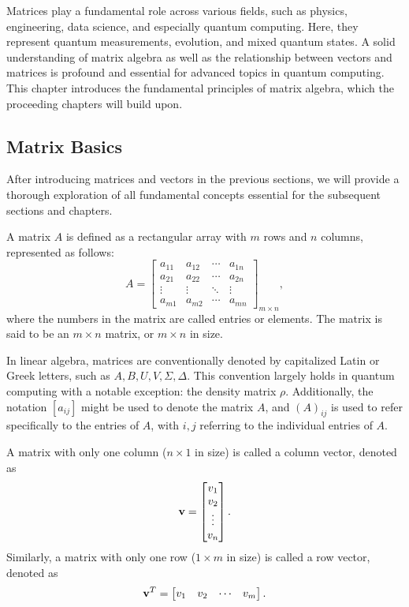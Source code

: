 \documentclass[12pt]{article}
\begin{document}
Matrices play a fundamental role across various fields, such as physics, engineering, data science, and especially quantum computing. Here, they represent quantum measurements, evolution, and mixed quantum states. A solid understanding of matrix algebra as well as the relationship between vectors and matrices is profound and essential for advanced topics in quantum computing. This chapter introduces the fundamental principles of matrix algebra, which the proceeding chapters will build upon. 

\subsection{Matrix Basics}

After introducing matrices and vectors in the previous sections, we will provide a thorough exploration of all fundamental concepts essential for the subsequent sections and chapters.

\begin{definition}[Matrix]
    A matrix $A$ is defined as a rectangular array with $m$ rows and $n$ columns, represented as follows:
    \[
    A = \begin{bmatrix}
    a_{11} & a_{12} & \cdots & a_{1n} \\
    a_{21} & a_{22} & \cdots & a_{2n} \\
    \vdots & \vdots & \ddots & \vdots \\
    a_{m1} & a_{m2} & \cdots & a_{mn}
    \end{bmatrix}_{m \times n},
    \]
    where the numbers in the matrix are called entries or elements. The matrix is said to be an $m \times n$ matrix, or $m \times n$ in size.
\end{definition}

In linear algebra, matrices are conventionally denoted by capitalized Latin or Greek letters, such as $A, B, U, V, \Sigma, \Delta$. This convention largely holds in quantum computing with a notable exception: the density matrix $\rho$. Additionally, the notation $[a_{ij}]$ might be used to denote the matrix $A$, and $(A)_{ij}$ is used to refer specifically to the entries of $A$, with $i,j$ referring to the individual entries of $A$.

\begin{definition}
    A matrix with only one column ($n \times 1$ in size) is called a column vector, denoted as
    \[
    \mathbf{v} =
    \begin{bmatrix}
    v_{1} \\
    v_{2} \\
    \vdots \\
    v_{n}
    \end{bmatrix}.
    \]
    Similarly, a matrix with only one row ($1 \times m$ in size) is called a row vector, denoted as
    \[
    \mathbf{v}^{T} =
    \begin{bmatrix}
    v_{1} & v_{2} & \cdots & v_{m}
    \end{bmatrix}.
    \]
\end{definition}
\end{document}
